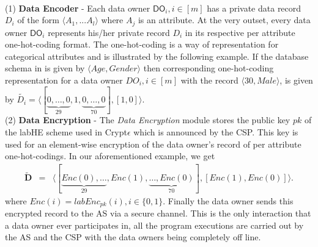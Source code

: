 \\
(1)\textbf{ Data Encoder} -  Each data owner $\textsf{DO}_i, i \in [m]$ has a private data record $D_i$ of the form $\langle A_1,...A_l\rangle$ where ${A}_j$ is an attribute. At the very outset, every data owner  $\textsf{DO}_i$ represents his/her private record $D_i$ in its respective per attribute one-hot-coding format. The one-hot-coding is a way of representation for categorical attributes and is illustrated by the following example. 
If the database schema in \system is given by  $\langle Age,Gender\rangle$ then corresponding one-hot-coding representation for a data owner $DO_i, i \in [m]$ with the record $\langle 30, Male\rangle$, is given by $\tilde{D_i}=\langle[\underbrace{0,\ldots,0}_{29},1,\underbrace{0,\ldots,0}_{70}],[1,0]\rangle$. \\
(2)\textbf{ Data Encryption} - The \textit{Data Encryption} module stores the public key $pk$ of the labHE scheme used in Crypt$\epsilon$ which is announced by the CSP. This key is used for an element-wise encryption of the data owner's  record of per attribute one-hot-codings. In our aforementioned example, we get
\begin{eqnarray}
\scriptstyle
\mathbf{\tilde{D}}&=&
\scriptstyle\langle[\underbrace{\scriptstyle Enc(0),\ldots}_{29},Enc(1),%
\underbrace{\scriptstyle \ldots,Enc(0)}_{70}], [Enc(1),Enc(0)]\rangle. \nonumber \end{eqnarray}
where $Enc(i) = labEnc_{pk}(i), i \in \{0,1\}$.
Finally the data owner sends this encrypted record to the \textsf{AS} via a secure channel. This is the only interaction that a data owner ever participates in, all the program executions are carried out by the \textsf{AS} and the \textsf{CSP} with the data owners being completely off line.

